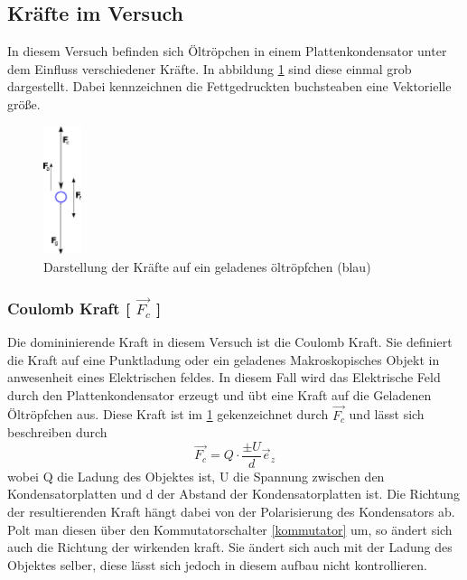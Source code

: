 \documentclass{scrartcl}
\begin{document}
	\subsection{Kräfte im Versuch}
		In diesem Versuch befinden sich Öltröpchen in einem Plattenkondensator unter dem Einfluss verschiedener Kräfte.
		In abbildung \ref{forces} sind diese einmal grob dargestellt. Dabei kennzeichnen die Fettgedruckten buchsteaben eine
		Vektorielle größe.
		\begin{figure}[H]
			\centering
			\includegraphics[width=0.1\textwidth]{kräfte.png} 
			\caption{Darstellung der Kräfte auf ein geladenes öltröpfchen (blau)}
			\label{forces}
		\end{figure}

		\subsubsection{Coulomb Kraft [ $\vec{F_c}$ ]}
			Die domininierende Kraft in diesem Versuch ist die Coulomb Kraft. Sie definiert die Kraft auf eine Punktladung oder ein
			geladenes Makroskopisches Objekt in anwesenheit eines Elektrischen feldes. In diesem Fall wird das Elektrische Feld
			durch den Plattenkondensator erzeugt und übt eine Kraft auf die Geladenen Öltröpfchen aus. Diese Kraft ist im \ref{forces}
			gekenzeichnet durch $\vec{F_c}$ und lässt sich beschreiben durch
			\begin{equation}
				\vec{F_c} = Q \cdot \frac{\pm U}{d} \vec{e}_z
			\end{equation}
			wobei Q die Ladung des Objektes ist, U die Spannung zwischen den Kondensatorplatten und d der Abstand der Kondensatorplatten ist.
			Die Richtung der resultierenden Kraft hängt dabei von der Polarisierung des Kondensators ab. Polt man diesen über den Kommutatorschalter \ref{kommutator}
			um, so ändert sich auch die Richtung der wirkenden kraft. Sie ändert sich auch mit der Ladung des Objektes selber,
			diese lässt sich jedoch in diesem aufbau nicht kontrollieren.	
		
\end{document}
